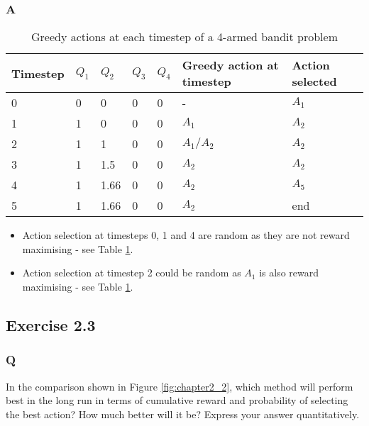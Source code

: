 \subsubsection*{A}
\begin{table}[h!]
	\begin{tabular}{lllllll}
		\hline
		Timestep & \(Q_1\) & \(Q_2\) & \(Q_3\) & \(Q_4\) & Greedy action at timestep & Action selected \\  \hline
		0        & 0    & 0    & 0    & 0    & -                         & \(A_1\)     \\        \hline
		1        & 1    & 0    & 0    & 0    & \(A_1\)                      & \(A_2\)      \\       \hline
		2        & 1    & 1    & 0    & 0    & \(A_1/A_2\)                 & \(A_2\)      \\       \hline
		3        & 1    & 1.5  & 0    & 0    & \(A_2\)                      & \(A_2\)     \\        \hline
		4        & 1    & 1.66 & 0    & 0    & \(A_2\)                      & \(A_5\)    \\         \hline
		5        & 1    & 1.66 & 0    & 0    & \(A_2\)                      & end       \\       \hline
	\end{tabular}
	\label{table: ex2.2}
	\caption{Greedy actions at each timestep of a 4-armed bandit problem}
\end{table}
\begin{itemize}
	\item Action selection at timesteps 0, 1 and 4 are random as they are not reward maximising - see Table \ref{table: ex2.2}.
	\item Action selection at timestep 2 could be random as \(A_1\) is also reward maximising - see Table \ref{table: ex2.2}.
\end{itemize}

\subsection{Exercise 2.3}
\subsubsection*{Q}
In the comparison shown in Figure \ref{fig:chapter2_2}, which method will perform best in the long run in terms of cumulative reward and probability of selecting the best action? How much better will it be? Express your answer quantitatively.


